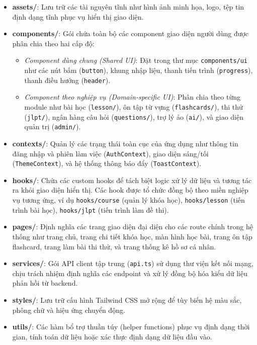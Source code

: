 \documentclass[../DoAn.tex]{subfiles}
\begin{document}
\begin{itemize}
    \item \textbf{assets/}: Lưu trữ các tài nguyên tĩnh như hình ảnh minh họa, logo, tệp tin định dạng tĩnh phục vụ hiển thị giao diện.
    \item \textbf{components/}: Gói chứa toàn bộ các component giao diện người dùng được phân chia theo hai cấp độ:
    \begin{itemize}
        \item \textit{Component dùng chung (Shared UI)}: Đặt trong thư mục \texttt{components/ui} như các nút bấm (\texttt{button}), khung nhập liệu, thanh tiến trình (\texttt{progress}), thanh điều hướng (\texttt{header}).
        \item \textit{Component theo nghiệp vụ (Domain-specific UI)}: Phân chia theo từng module như bài học (\texttt{lesson/}), ôn tập từ vựng (\texttt{flashcards/}), thi thử (\texttt{jlpt/}), ngân hàng câu hỏi (\texttt{questions/}), trợ lý ảo (\texttt{ai/}), và giao diện quản trị (\texttt{admin/}).
    \end{itemize}
    \item \textbf{contexts/}: Quản lý các trạng thái toàn cục của ứng dụng như thông tin đăng nhập và phiên làm việc (\texttt{AuthContext}), giao diện sáng/tối (\texttt{ThemeContext}), và hệ thống thông báo đẩy (\texttt{ToastContext}).
    \item \textbf{hooks/}: Chứa các custom hooks để tách biệt logic xử lý dữ liệu và tương tác ra khỏi giao diện hiển thị. Các hook được tổ chức đồng bộ theo miền nghiệp vụ tương ứng, ví dụ \texttt{hooks/course} (quản lý khóa học), \texttt{hooks/lesson} (tiến trình bài học), \texttt{hooks/jlpt} (tiến trình làm đề thi).
    \item \textbf{pages/}: Định nghĩa các trang giao diện đại diện cho các route chính trong hệ thống như trang chủ, trang chi tiết khóa học, màn hình học bài, trang ôn tập flashcard, trang làm bài thi thử, và trang thống kê hồ sơ cá nhân.
    \item \textbf{services/}: Gói API client tập trung (\texttt{api.ts}) sử dụng thư viện kết nối mạng, chịu trách nhiệm định nghĩa các endpoint và xử lý đồng bộ hóa kiểu dữ liệu phản hồi từ backend.
    \item \textbf{styles/}: Lưu trữ cấu hình Tailwind CSS mở rộng để tùy biến hệ màu sắc, phông chữ và hiệu ứng chuyển động.
    \item \textbf{utils/}: Các hàm bổ trợ thuần túy (helper functions) phục vụ định dạng thời gian, tính toán dữ liệu hoặc xác thực định dạng dữ liệu đầu vào.
\end{itemize}
\end{document}
